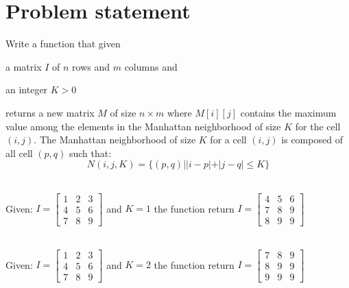 \section{Problem statement}
\begin{exercise}
\label{example:max_manhattan:exercice1}
Write a function that given \begin{enumerate*}
    \item a matrix $I$ of $n$ rows and $m$ columns and
    \item  an integer $K > 0$
\end{enumerate*}
returns a new matrix $M$ of size $n \times m$ where $M[i][j]$ contains the maximum value among the
elements in the Manhattan neighborhood of size $K$ for the cell $(i,j)$. The Manhattan neighborhood
of size $K$ for a cell $(i,j)$ is composed of all cell $(p,q)$ such that:
\begin{equation}
    N(i,j, K) = \{(p,q) | |i-p|+|j-q| \leq K\}
    \label{eq:max_manhattan:neighbood_equation}
\end{equation}


\end{exercise}
    \begin{example}
        \label{example:max_manhattan:example1}
        \hfill \\
        Given: $I=
        \begin{bmatrix}
          1 & 2 & 3  \\
          4 & 5 & 6  \\
          7 & 8 & 9  
        \end{bmatrix}
      $
  and $K=1$ the function return $I=
  \begin{bmatrix}
      4 & 5 & 6  \\
      7 & 8 & 9  \\
      8 & 9 & 9  
    \end{bmatrix}
$
        
    \end{example}

    \begin{example}
        \label{example:max_manhattan:example2}
        \hfill \\
        Given: $I=
        \begin{bmatrix}
          1 & 2 & 3  \\
          4 & 5 & 6  \\
          7 & 8 & 9  
        \end{bmatrix}
      $
  and $K=2$ the function return $I=
  \begin{bmatrix}
      7 & 8 & 9  \\
      8 & 9 & 9  \\
      9 & 9 & 9  
    \end{bmatrix}
$
        
    \end{example}




